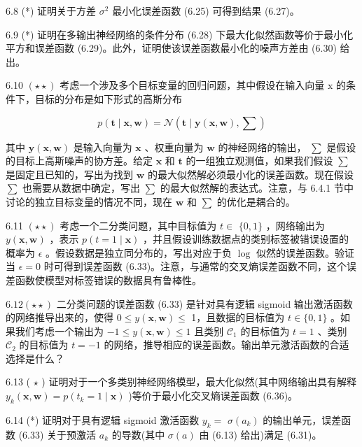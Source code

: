 \documentclass[10pt]{report}
\begin{document}
6.8 (*) 证明关于方差 \({\sigma }^{2}\) 最小化误差函数 (6.25) 可得到结果 (6.27)。

6.9 (*) 证明在多输出神经网络的条件分布 (6.28) 下最大化似然函数等价于最小化平方和误差函数 (6.29)。此外，证明使该误差函数最小化的噪声方差由 (6.30) 给出。

6.10 \(\left( {\star  \star  }\right)\) 考虑一个涉及多个目标变量的回归问题，其中假设在输入向量 \(\mathrm{x}\) 的条件下，目标的分布是如下形式的高斯分布

\[
p\left( {\mathbf{t} \mid  \mathbf{x},\mathbf{w}}\right)  = \mathcal{N}\left( {\mathbf{t} \mid  \mathbf{y}\left( {\mathbf{x},\mathbf{w}}\right) ,\mathbf{\sum }}\right)  \tag{6.66}
\]

其中 \(\mathbf{y}\left( {\mathbf{x},\mathbf{w}}\right)\) 是输入向量为 \(\mathbf{x}\) 、权重向量为 \(\mathbf{w}\) 的神经网络的输出， \(\mathbf{\sum }\) 是假设的目标上高斯噪声的协方差。给定 \(\mathbf{x}\) 和 \(\mathbf{t}\) 的一组独立观测值，如果我们假设 \(\sum\) 是固定且已知的，写出为找到 \(\mathbf{w}\) 的最大似然解必须最小化的误差函数。现在假设 \(\sum\) 也需要从数据中确定，写出 \(\mathbf{\sum }\) 的最大似然解的表达式。注意，与 6.4.1 节中讨论的独立目标变量的情况不同，现在 \(\mathbf{w}\) 和 \(\mathbf{\sum }\) 的优化是耦合的。

6.11 \(\left( {\star  \star  }\right)\) 考虑一个二分类问题，其中目标值为 \(t \in\)  \(\{ 0,1\}\) ，网络输出为 \(y\left( {\mathbf{x},\mathbf{w}}\right)\) ，表示 \(p\left( {t = 1 \mid  \mathbf{x}}\right)\) ，并且假设训练数据点的类别标签被错误设置的概率为 \(\epsilon\) 。假设数据是独立同分布的，写出对应于负 \(\log\) 似然的误差函数。验证当 \(\epsilon  = 0\) 时可得到误差函数 (6.33)。注意，与通常的交叉熵误差函数不同，这个误差函数使模型对标签错误的数据具有鲁棒性。

\({6.12}\left( {\star  \star  }\right)\) 二分类问题的误差函数 (6.33) 是针对具有逻辑 sigmoid 输出激活函数的网络推导出来的，使得 \(0 \leq  y\left( {\mathbf{x},\mathbf{w}}\right)  \leq\) 1，且数据的目标值为 \(t \in  \{ 0,1\}\) 。如果我们考虑一个输出为 \(- 1 \leq  y\left( {\mathbf{x},\mathbf{w}}\right)  \leq  1\) 且类别 \({\mathcal{C}}_{1}\) 的目标值为 \(t = 1\) 、类别 \({\mathcal{C}}_{2}\) 的目标值为 \(t =  - 1\) 的网络，推导相应的误差函数。输出单元激活函数的合适选择是什么？

6.13 ( \(\star\) ) 证明对于一个多类别神经网络模型，最大化似然(其中网络输出具有解释 \({y}_{k}\left( {\mathbf{x},\mathbf{w}}\right)  = p\left( {{t}_{k} = 1 \mid  \mathbf{x}}\right)\) )等价于最小化交叉熵误差函数 (6.36)。

6.14 (*) 证明对于具有逻辑 sigmoid 激活函数 \({y}_{k} =\)  \(\sigma \left( {a}_{k}\right)\) 的输出单元，误差函数 (6.33) 关于预激活 \({a}_{k}\) 的导数(其中 \(\sigma \left( a\right)\) 由 (6.13) 给出)满足 (6.31)。
\end{document}
